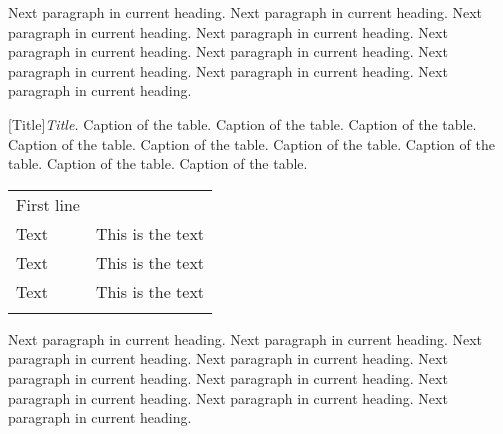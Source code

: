 %
%

Next paragraph in current heading. Next paragraph in current heading.
Next paragraph in current heading. Next paragraph in current heading.
Next paragraph in current heading. Next paragraph in current heading.
Next paragraph in current heading. Next paragraph in current heading.
Next paragraph in current heading.

%
%

\begin{table}[h!]
[Title]{\textit{Title.} Caption of the table. Caption of the table. Caption of the table.
Caption of the table. Caption of the table. Caption of the table. Caption of the table. Caption of the table. Caption of the table.}
\label{tb:table}
\vspace{-5mm}
\begin{center}
\begin{tabular}{ p{3cm} p{11.4cm} }
\hhline{--}
\rowcolor[gray]{0.9} First line & \\ \hhline{--}
Text & This is the text \\
Text & This is the text \\
Text & This is the text \\
\hhline{--}
\end{tabular}
\end{center}
\end{table}
\vspace{-5mm}

%
%
%
%
%
%

Next paragraph in current heading. Next paragraph in current heading.
Next paragraph in current heading. Next paragraph in current heading.
Next paragraph in current heading. Next paragraph in current heading.
Next paragraph in current heading. Next paragraph in current heading.
Next paragraph in current heading.


